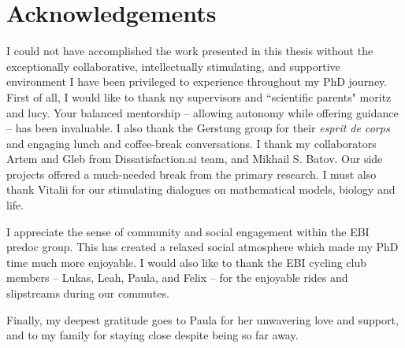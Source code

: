 \chapter*{Acknowledgements}

I could not have accomplished the work presented in this thesis without the exceptionally collaborative, intellectually stimulating, and supportive environment I have been privileged to experience throughout my PhD journey. First of all, I would like to thank my supervisors and ``scientific parents" \acl{moritz} and \acl{lucy}. Your balanced mentorship -- allowing autonomy while offering guidance -- has been invaluable. I also thank the Gerstung group for their \textit{esprit de corps} and engaging lunch and coffee-break conversations. I thank my collaborators Artem and Gleb from Dissatisfaction.ai team, and Mikhail S. Batov. Our side projects offered a much-needed break from the primary research. I must also thank Vitalii for our stimulating dialogues on mathematical models, biology and life. 

I appreciate the sense of community and social engagement within the EBI predoc group. This has created a relaxed social atmosphere which made my PhD time much more enjoyable. I would also like to thank the EBI cycling club members -- Lukas, Leah, Paula, and Felix -- for the enjoyable rides and slipstreams during our commutes.

Finally, my deepest gratitude goes to Paula for her unwavering love and support, and to my family for staying close despite being so far away.

